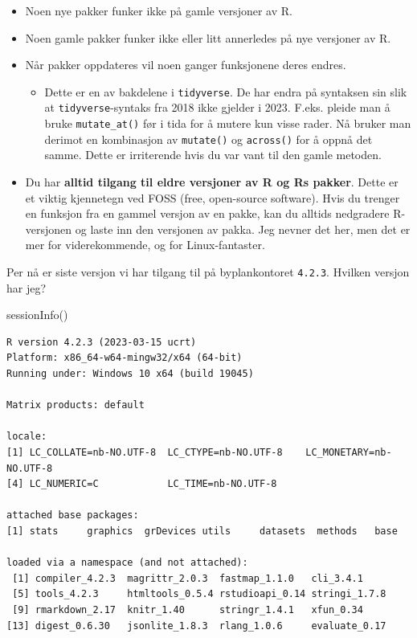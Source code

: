 \documentclass[
  letterpaper,
  DIV=11,
  numbers=noendperiod]{scrreprt}
\newenvironment{Shaded}{\begin{snugshade}}{\end{snugshade}}
\newcommand{\FunctionTok}[1]{\textcolor[rgb]{0.28,0.35,0.67}{#1}}
\newcommand{\NormalTok}[1]{\textcolor[rgb]{0.00,0.23,0.31}{#1}}
\providecommand{\tightlist}{%
  \setlength{\itemsep}{0pt}\setlength{\parskip}{0pt}}\usepackage{longtable,booktabs,array}
\begin{document}
\begin{itemize}
\tightlist
\item
  Noen nye pakker funker ikke på gamle versjoner av R.
\item
  Noen gamle pakker funker ikke eller litt annerledes på nye versjoner
  av R.
\item
  Når pakker oppdateres vil noen ganger funksjonene deres endres.

  \begin{itemize}
  \tightlist
  \item
    Dette er en av bakdelene i \texttt{tidyverse}. De har endra på
    syntaksen sin slik at \texttt{tidyverse}-syntaks fra 2018 ikke
    gjelder i 2023. F.eks. pleide man å bruke \texttt{mutate\_at()} før
    i tida for å mutere kun visse rader. Nå bruker man derimot en
    kombinasjon av \texttt{mutate()} og \texttt{across()} for å oppnå
    det samme. Dette er irriterende hvis du var vant til den gamle
    metoden.
  \end{itemize}
\item
  Du har \textbf{alltid tilgang til eldre versjoner av R og Rs pakker}.
  Dette er et viktig kjennetegn ved FOSS (free, open-source software).
  Hvis du trenger en funksjon fra en gammel versjon av en pakke, kan du
  alltids nedgradere R-versjonen og laste inn den versjonen av pakka.
  Jeg nevner det her, men det er mer for viderekommende, og for
  Linux-fantaster.
\end{itemize}

Per nå er siste versjon vi har tilgang til på byplankontoret
\texttt{4.2.3}. Hvilken versjon har jeg?

\begin{Shaded}
\begin{Highlighting}[]
\FunctionTok{sessionInfo}\NormalTok{()}
\end{Highlighting}
\end{Shaded}

\begin{verbatim}
R version 4.2.3 (2023-03-15 ucrt)
Platform: x86_64-w64-mingw32/x64 (64-bit)
Running under: Windows 10 x64 (build 19045)

Matrix products: default

locale:
[1] LC_COLLATE=nb-NO.UTF-8  LC_CTYPE=nb-NO.UTF-8    LC_MONETARY=nb-NO.UTF-8
[4] LC_NUMERIC=C            LC_TIME=nb-NO.UTF-8    

attached base packages:
[1] stats     graphics  grDevices utils     datasets  methods   base     

loaded via a namespace (and not attached):
 [1] compiler_4.2.3  magrittr_2.0.3  fastmap_1.1.0   cli_3.4.1      
 [5] tools_4.2.3     htmltools_0.5.4 rstudioapi_0.14 stringi_1.7.8  
 [9] rmarkdown_2.17  knitr_1.40      stringr_1.4.1   xfun_0.34      
[13] digest_0.6.30   jsonlite_1.8.3  rlang_1.0.6     evaluate_0.17  
\end{verbatim}
\end{document}
